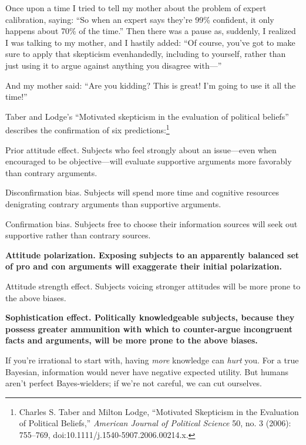 
{
 Once upon a time I tried to tell my mother about the problem of
expert calibration, saying: ``So when an expert says
they're 99\% confident, it only happens about 70\% of
the time.'' Then there was a pause as, suddenly, I
realized I was talking to my mother, and I hastily added:
``Of course, you've got to make sure
to apply that skepticism evenhandedly, including to yourself, rather
than just using it to argue against anything you disagree
with---'' }

{
 And my mother said: ``Are you kidding? This is
great! I'm going to use it all the
time!''}

{
 Taber and Lodge's ``Motivated
skepticism in the evaluation of political beliefs''
describes the confirmation of six predictions:\footnote{Charles S. Taber and Milton Lodge, ``Motivated
Skepticism in the Evaluation of Political Beliefs,''
\textit{American Journal of Political Science} 50, no. 3 (2006):
755--769, doi:10.1111/j.1540-5907.2006.00214.x.}}

{
 Prior attitude effect. Subjects who feel strongly about an
issue---even when encouraged to be objective---will evaluate supportive
arguments more favorably than contrary arguments.}

{
 Disconfirmation bias. Subjects will spend more time and cognitive
resources denigrating contrary arguments than supportive arguments.}

{
 Confirmation bias. Subjects free to choose their information
sources will seek out supportive rather than contrary sources.}

{
 \textbf{Attitude polarization. Exposing subjects to an apparently
balanced set of pro and con arguments will exaggerate their initial
polarization.}}

{
 Attitude strength effect. Subjects voicing stronger attitudes will
be more prone to the above biases.}

{
 \textbf{Sophistication effect. Politically knowledgeable subjects,
because they possess greater ammunition with which to counter-argue
incongruent facts and arguments, will be more prone to the above
biases.}}

{
 If you're irrational to start with, having
\textit{more} knowledge can \textit{hurt} you. For a true Bayesian,
information would never have negative expected utility. But humans
aren't perfect Bayes-wielders; if we're
not careful, we can cut ourselves.}


